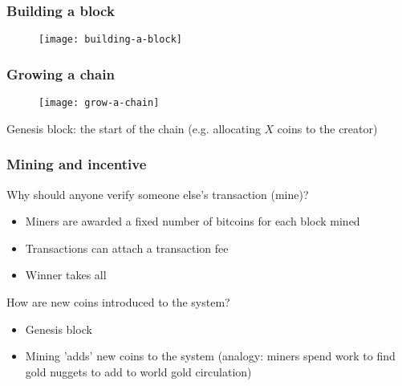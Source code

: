 \documentclass{beamer}
\begin{document}
\begin{frame}
\frametitle{Building a block}

\begin{figure}
  \centering
  \texttt{[image: building-a-block]}
\end{figure}

\end{frame}

\begin{frame}
\frametitle{Growing a chain}

\begin{figure}
  \centering
  \texttt{[image: grow-a-chain]}
\end{figure}

Genesis block: the start of the chain (e.g. allocating $X$ coins to the creator)

\end{frame}

\begin{frame}
\frametitle{Mining and incentive}

\vspace{0.2in}
Why should anyone verify someone else's transaction (mine)?
\begin{itemize}
  \item Miners are awarded a fixed number of bitcoins for each block mined
  \item Transactions can attach a transaction fee
  \item Winner takes all
\end{itemize}

\vspace{0.2in}
How are new coins introduced to the system?
\begin{itemize}
  \item Genesis block
  \item Mining 'adds' new coins to the system (analogy: miners spend work to find gold nuggets to add to world gold circulation)
\end{itemize}

\end{frame}
\end{document}
